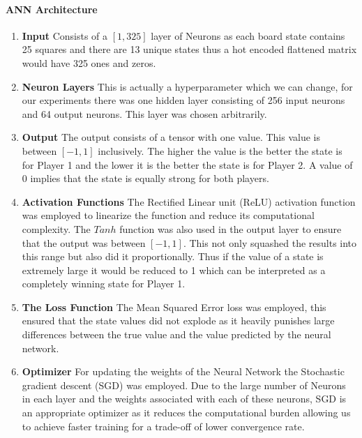\documentclass[a4paper,12pt,table]{article}
\begin{document}
\paragraph{ANN Architecture}
\begin{enumerate}
    \item \textbf{Input}
    \newline
    Consists of a $[1,325]$ layer of Neurons as each board state contains 25 squares and there are 13 unique states thus a hot encoded flattened matrix would have 325 ones and zeros.
    \item \textbf{Neuron Layers}
    \newline
    This is actually a hyperparameter which we can change, for our experiments there was one hidden layer consisting of 256 input neurons and 64 output neurons. This layer was chosen arbitrarily.
    \item \textbf{Output}
    \newline
    The output consists of a tensor with one value. This value is between $[-1,1]$ inclusively. The higher the value is the better the state is for Player 1 and the lower it is the better the state is for Player 2. A value of 0 implies that the state is equally strong for both players.
    \item \textbf{Activation Functions}
    \newline
    The Rectified Linear unit (ReLU) activation function was employed to linearize the function and reduce its computational complexity. The $Tanh$ function was also used in the output layer to ensure that the output was between $[-1,1]$. This not only squashed the results into this range but also did it proportionally. Thus if the value of a state is extremely large it would be reduced to 1 which can be interpreted as a completely winning state for Player 1.
    \item \textbf{The Loss Function}
    \newline
    The Mean Squared Error loss was employed, this ensured that the state values did not explode as it heavily punishes large differences between the true value and the value predicted by the neural network.
    \item \textbf{Optimizer}
    \newline
    For updating the weights of the Neural Network the Stochastic gradient descent (SGD) was employed. Due to the large number of Neurons in each layer and the weights associated with each of these neurons, SGD is an appropriate optimizer as it reduces the computational burden allowing us to achieve faster training for a trade-off of lower convergence rate.
\end{enumerate}
\end{document}
